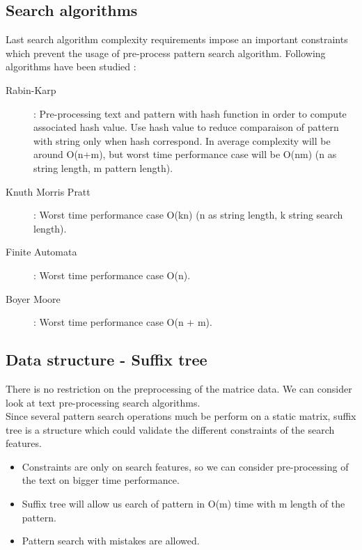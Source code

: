 \subsection{Search algorithms}

\par
Last search algorithm complexity requirements impose an important constraints which prevent the usage of pre-process pattern search algorithm. Following algorithms have been studied :
\begin{description}
	\item[Rabin-Karp] : Pre-processing text and pattern with hash function in order to compute associated hash value. Use hash value to reduce comparaison of pattern with string only when hash correspond. In average complexity will be around O(n+m), but worst time performance case will be O(nm) (n as string length, m pattern length). 
	\item[Knuth Morris Pratt] : Worst time performance case O(kn) (n as string length, k string search length).
	\item[Finite Automata] : Worst time performance case O(n).
	\item[Boyer Moore] : Worst time performance case O(n + m).
\end{description}

\subsection{Data structure - Suffix tree}

\par
There is no restriction on the preprocessing of the matrice data. We can consider look at text pre-processing search algorithms.\\
Since several pattern search operations much be perform on a static matrix, suffix tree is a structure which could validate the different constraints of the search features.\\
\begin{itemize}
	\item Constraints are only on search features, so we can consider pre-processing of the text on bigger time performance.
	\item Suffix tree will allow us earch of pattern in O(m) time with m length of the pattern.
	\item Pattern search with mistakes are allowed.
\end{itemize}

